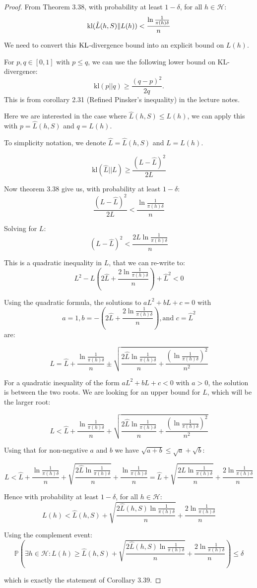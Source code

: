 \begin{proof}
From Theorem 3.38, with probability at least $1-\delta$, for all $h \in \mathcal{H}$:
$$\operatorname{kl}(\hat{L}(h,S)\|L(h)) < \frac{\ln\frac{1}{\pi(h)\delta}}{n}$$

We need to convert this $\operatorname{KL}$-divergence bound into an explicit bound on $L(h)$.

For $p, q \in [0,1]$ with $p \leq q$, we can use the following lower bound on KL-divergence:
$$\text{kl}(p||q) \geq \frac{(q-p)^2}{2q}.$$
This is from corollary 2.31 (Reﬁned Pinsker’s inequality) in the lecture notes.

Here we are interested in the case where $\hat{L}(h,S) \leq L(h)$, we can apply this with $p = \hat{L}(h,S)$ and $q = L(h)$.

To simplicity notation, we  denote $\hat{L} = \hat{L}(h,S)$ and $L = L(h)$.

$$\text{kl}(\hat{L}||L) \geq \frac{(L-\hat{L})^2}{2L}$$

Now theorem 3.38 give us, with probability at least $1-\delta$:
$$\frac{(L-\hat{L})^2}{2L} < \frac{\ln\frac{1}{\pi(h)\delta}}{n}$$

Solving for $L$:
$$(L-\hat{L})^2 < \frac{2L\ln\frac{1}{\pi(h)\delta}}{n}$$

This is a quadratic inequality in $L$, that we can re-write to:
$$L^2 - L\left(2\hat{L} + \frac{2\ln\frac{1}{\pi(h)\delta}}{n}\right) + \hat{L}^2 < 0$$

Using the quadratic formula, the solutions to $aL^2 + bL + c = 0$ with $$a = 1, b = -\left(2\hat{L} + \frac{2\ln\frac{1}{\pi(h)\delta}}{n}\right), \text{and } c = \hat{L}^2$$ are:

$$L = \hat{L} + \frac{\ln\frac{1}{\pi(h)\delta}}{n} \pm \sqrt{\frac{2\hat{L}\ln\frac{1}{\pi(h)\delta}}{n} + \frac{(\ln\frac{1}{\pi(h)\delta})^2}{n^2}}$$

For a quadratic inequality of the form $aL^2 + bL + c < 0$ with $a > 0$, the solution is between the two roots. We are looking for an upper bound for $L$, which will be the larger root:

$$L < \hat{L} + \frac{\ln\frac{1}{\pi(h)\delta}}{n} + \sqrt{\frac{2\hat{L}\ln\frac{1}{\pi(h)\delta}}{n} + \frac{(\ln\frac{1}{\pi(h)\delta})^2}{n^2}}$$

Using that for non-negative $a$ and $b$ we have $\sqrt{a+b} \leq \sqrt{a} + \sqrt{b}$:

$$L < \hat{L} + \frac{\ln\frac{1}{\pi(h)\delta}}{n} + \sqrt{\frac{2\hat{L}\ln\frac{1}{\pi(h)\delta}}{n}} + \frac{\ln\frac{1}{\pi(h)\delta}}{n} = \hat{L} + \sqrt{\frac{2\hat{L}\ln\frac{1}{\pi(h)\delta}}{n}} + \frac{2\ln\frac{1}{\pi(h)\delta}}{n}$$

Hence with probability at least $1-\delta$, for all $h \in \mathcal{H}$:
$$L(h) < \hat{L}(h,S) + \sqrt{\frac{2\hat{L}(h,S)\ln\frac{1}{\pi(h)\delta}}{n}} + \frac{2\ln\frac{1}{\pi(h)\delta}}{n}$$

Using the complement event:
$$\mathbb{P}\left(\exists h \in \mathcal{H} : L(h) \geq \hat{L}(h,S) + \sqrt{\frac{2\hat{L}(h,S)\ln\frac{1}{\pi(h)\delta}}{n}} + \frac{2\ln\frac{1}{\pi(h)\delta}}{n}\right) \leq \delta$$

which is exactly the statement of Corollary 3.39.
\end{proof}

